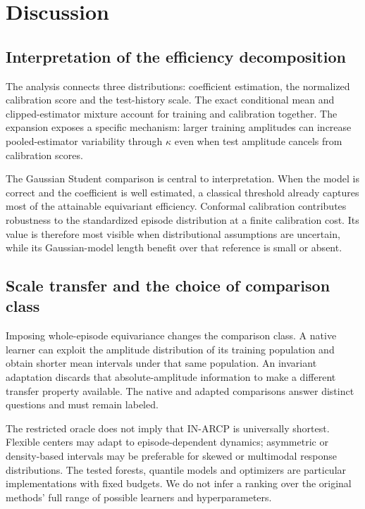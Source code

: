 \documentclass[nolineno]{ieeeaccess}
\begin{document}


\section{Discussion}
\subsection{Interpretation of the efficiency decomposition}
The analysis connects three distributions: coefficient estimation, the normalized calibration score and the test-history scale. The exact conditional mean and clipped-estimator mixture account for training and calibration together. The expansion exposes a specific mechanism: larger training amplitudes can increase pooled-estimator variability through $\kappa$ even when test amplitude cancels from calibration scores.

The Gaussian Student comparison is central to interpretation. When the model is correct and the coefficient is well estimated, a classical threshold already captures most of the attainable equivariant efficiency. Conformal calibration contributes robustness to the standardized episode distribution at a finite calibration cost. Its value is therefore most visible when distributional assumptions are uncertain, while its Gaussian-model length benefit over that reference is small or absent.

\subsection{Scale transfer and the choice of comparison class}
Imposing whole-episode equivariance changes the comparison class. A native learner can exploit the amplitude distribution of its training population and obtain shorter mean intervals under that same population. An invariant adaptation discards that absolute-amplitude information to make a different transfer property available. The native and adapted comparisons answer distinct questions and must remain labeled.

The restricted oracle does not imply that IN-ARCP is universally shortest. Flexible centers may adapt to episode-dependent dynamics; asymmetric or density-based intervals may be preferable for skewed or multimodal response distributions. The tested forests, quantile models and optimizers are particular implementations with fixed budgets. We do not infer a ranking over the original methods' full range of possible learners and hyperparameters.
\end{document}

